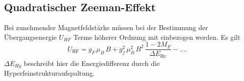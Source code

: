 \subsection{Quadratischer Zeeman-Effekt}
Bei zunehmender Magnetfeldstärke müssen bei der Bestimmung der Übergangsenergie $U_{HF}$ Terme höherer Ordnung mit einbezogen werden. Es gilt
\begin{equation}
  \label{eqn:zeeman^2}
  U_\mathrm{HF} = g_F\,\mu_B\,B + g_f^2\,\mu_B^2\,B^2\,\frac{1-2M_F}{\Delta E_\mathrm{Hy}}-... .
\end{equation}
$\Delta E_{Hy}$ beschreibt hier die Energiedifferenz durch die Hyperfeinstrukturaufspaltung.

